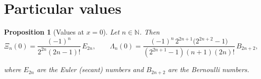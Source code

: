 \documentclass[11pt,twoside]{article}
\newtheorem{proposition}[theorem]{Proposition}
\numberwithin{equation}{section}
\begin{document}
\section{Particular values}

\begin{proposition}[Values at $x=0$]\label{prop:XiLambda-at-zero}
Let $n \in \mathbb{N}$. Then
\begin{equation}
\Xi_n(0)=\frac{(-1)^{n}}{2^{2n}(2n-1)!}\,E_{2n},
\qquad
\Lambda_n(0)=\frac{(-1)^{n}\,2^{2n+1}\bigl(2^{2n+2}-1\bigr)}{(2^{2n+1}-1)(n+1)(2n)!}\,B_{2n+2},
\label{eq:values_at_zero}
\end{equation}

where $E_{2n}$ are the Euler (secant) numbers and $B_{2n+2}$ are the Bernoulli numbers.
\end{proposition}
\end{document}
